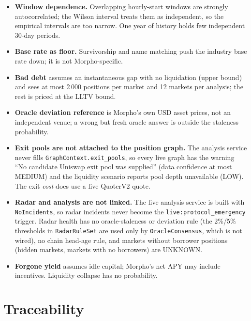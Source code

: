 \documentclass[11pt,a4paper]{article}
\newcommand{\code}[1]{\texttt{#1}}
\begin{document}
\begin{itemize}
\item \textbf{Window dependence.} Overlapping hourly-start windows are strongly
  autocorrelated; the Wilson interval treats them as independent, so the
  empirical intervals are too narrow. One year of history holds few independent
  30-day periods.
\item \textbf{Base rate as floor.} Survivorship and name matching push the
  industry base rate down; it is not Morpho-specific.
\item \textbf{Bad debt} assumes an instantaneous gap with no liquidation (upper
  bound) and sees at most 2\,000 positions per market and 12 markets per analysis;
  the rest is priced at the LLTV bound.
\item \textbf{Oracle deviation reference} is Morpho's own USD asset prices, not an
  independent venue; a wrong but fresh oracle answer is outside the staleness
  probability.
\item \textbf{Exit pools are not attached to the position graph.} The analysis
  service never fills \code{GraphContext.exit\_pools}, so every live graph has the
  warning ``No candidate Uniswap exit pool was supplied'' (data confidence at most
  MEDIUM) and the liquidity scenario reports pool depth unavailable (LOW). The exit
  \emph{cost} does use a live QuoterV2 quote.
\item \textbf{Radar and analysis are not linked.} The live analysis service is
  built with \code{NoIncidents}, so radar incidents never become the
  \code{live:protocol\_emergency} trigger. Radar health has no oracle-staleness or
  deviation rule (the 2\%/5\% thresholds in \code{RadarRuleSet} are used only by
  \code{OracleConsensus}, which is not wired), no chain head-age rule, and markets
  without borrower positions (hidden markets, markets with no borrowers) are
  UNKNOWN.
\item \textbf{Forgone yield} assumes idle capital; Morpho's net APY may include
  incentives. Liquidity collapse has no probability.
\end{itemize}

\section{Traceability}
\end{document}
